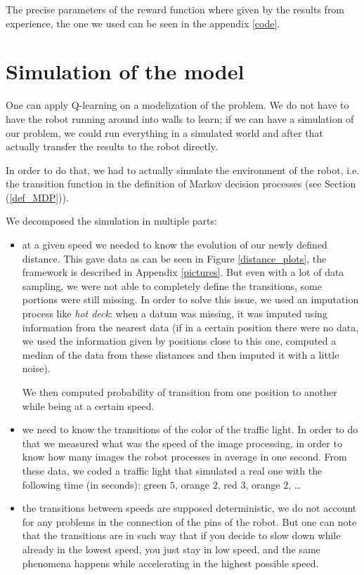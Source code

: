 \documentclass[14pt,a4paper]{article}
\theoremstyle{definition}
\begin{document}
The precise parameters of the reward function where given by the results from experience, the one we used can be seen in the appendix \ref{code}.

\section{Simulation of the model} \label{simulation}

One can apply Q-learning on a modelization of the problem. We do not have to have the robot running around into walls to learn; if we can have a simulation of our problem, we could run everything in a simulated world and after that actually transfer the results to the robot directly.

In order to do that, we had to actually simulate the environment of the robot, i.e. the transition function in the definition of Markov decision processes (see Section (\ref{def_MDP})).


We decomposed the simulation in multiple parts: 
\begin{itemize}
\item at a given speed we needed to know the evolution of our newly defined distance. This gave data as can be seen in Figure \ref{distance_plots}, the framework is described in Appendix \ref{pictures}. But even with a lot of data sampling, we were not able to completely define the transitions, some portions were still missing. In order to solve this issue, we used an imputation process like \emph{hot deck}: when a datum was missing, it was imputed using information from the nearest data (if in a certain position there were no data, we used the information given by positions close to this one, computed a median of the data from these distances and then imputed it with a little noise).

 We then computed probability of transition from one position to another while being at a certain speed.
\item we need to know the transitions of the color of the traffic light. In order to do that we measured what was the speed of the image processing, in order to know how many images the robot processes in average in one second. From these data, we coded a traffic light that simulated a real one with the following time (in seconds): green $5$, orange $2$, red $3$, orange $2$, \ldots
\item the transitions between speeds are supposed deterministic, we do not account for any problems in the connection of the pins of the robot. But one can note that the transitions are in such way that if you decide to slow down while already in the lowest speed, you just stay in low speed, and the same phenomena happens while accelerating in the highest possible speed.
\end{itemize}
\end{document}
